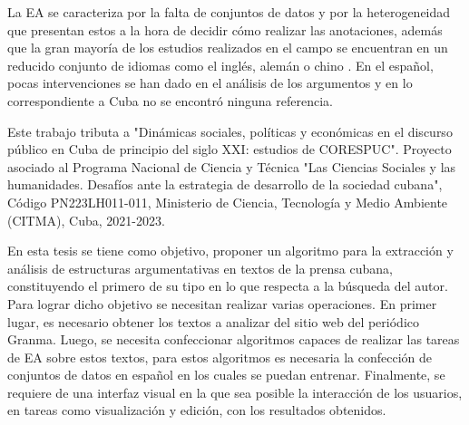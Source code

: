 \documentclass[a4paper,11pt,twocolumn,twoside]{article}
\begin{document}
La EA se caracteriza por la falta de conjuntos de datos y 
por la heterogeneidad que presentan estos a la hora de decidir cómo realizar las 
anotaciones, además que la gran mayoría de los estudios realizados en el campo se encuentran en 
un reducido conjunto de idiomas como el inglés, alemán o chino \cite{eger2018cross}. 
En el español, pocas intervenciones se han dado en el análisis de los argumentos \cite{esteve2020mineria} y en 
lo correspondiente a Cuba no se encontró ninguna referencia. 


Este trabajo tributa a "Dinámicas sociales, políticas y económicas en el discurso público 
en Cuba de principio del siglo XXI: estudios de CORESPUC". Proyecto 
asociado al Programa Nacional de Ciencia y Técnica "Las Ciencias Sociales y las humanidades. 
Desafíos ante la estrategia de desarrollo de la sociedad cubana", Código PN223LH011-011, Ministerio
de Ciencia, Tecnología y Medio Ambiente (CITMA), Cuba, 2021-2023.


En esta tesis se tiene como objetivo, proponer un algoritmo para 
la extracción y análisis de estructuras argumentativas en textos 
de la prensa cubana, constituyendo el primero de su tipo en lo que respecta a la búsqueda del autor. 
Para lograr dicho objetivo se necesitan realizar varias operaciones.
En primer lugar, es necesario obtener los textos a analizar del sitio 
web del periódico Granma. Luego, se necesita confeccionar algoritmos capaces de realizar las tareas 
de EA sobre estos textos, para estos algoritmos es necesaria la confección de conjuntos 
de datos en español en los cuales se puedan entrenar. Finalmente, se requiere de una interfaz visual 
en la que sea posible la interacción de los usuarios, en tareas como visualización y edición, 
con los resultados obtenidos. 
\end{document}
